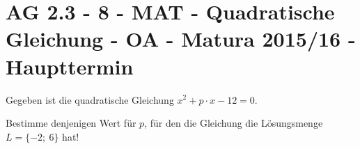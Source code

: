 \section{AG 2.3 - 8 - MAT - Quadratische Gleichung - OA - Matura 2015/16 - Haupttermin}

\begin{beispiel}[AG 2.3]{1} %
Gegeben ist die quadratische Gleichung $x^2+p\cdot x - 12  =0$. \leer

Bestimme denjenigen Wert für $p$, für den die Gleichung die Lösungsmenge \mbox{$L =\{-2;~6\}$} hat!


\end{beispiel}